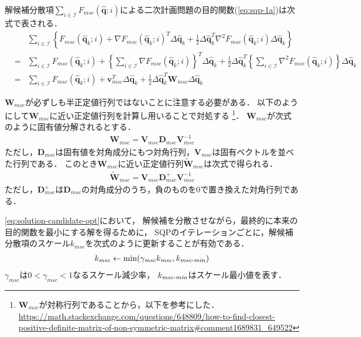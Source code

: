 解候補分散項$\sum_{i \in \mathcal{I}} F_{\mathit{msc}}(\bm{\hat{q}}; i)$による二次計画問題の目的関数(\eqref{eq:sqp-1a})は次式で表される．
\begin{eqnarray}
  &&\sum_{i \in \mathcal{I}} \left\{ F_{\mathit{msc}}(\bm{\hat{q}}_k; i) + \nabla F_{\mathit{msc}}(\bm{\hat{q}}_k; i)^T \Delta \bm{\hat{q}}_k + \frac{1}{2} \Delta \bm{\hat{q}}_k^T \nabla^2 F_{\mathit{msc}}(\bm{\hat{q}}_k; i) \Delta \bm{\hat{q}}_k \right\} \\
  &=&
  \sum_{i \in \mathcal{I}} F_{\mathit{msc}}(\bm{\hat{q}}_k; i)
  + \left\{ \sum_{i \in \mathcal{I}} \nabla F_{\mathit{msc}}(\bm{\hat{q}}_k; i) \right\}^T \Delta \bm{\hat{q}}_k
  + \frac{1}{2} \Delta \bm{\hat{q}}_k^T \left\{ \sum_{i \in \mathcal{I}} \nabla^2 F_{\mathit{msc}}(\bm{\hat{q}}_k; i) \right\} \Delta \bm{\hat{q}}_k \\
  &=&
  \sum_{i \in \mathcal{I}} F_{\mathit{msc}}(\bm{\hat{q}}_k; i) + \bm{v}_{\mathit{msc}}^T \Delta \bm{\hat{q}}_k + \frac{1}{2} \Delta \bm{\hat{q}}_k^T \bm{W}_{\mathit{msc}} \Delta \bm{\hat{q}}_k
\end{eqnarray}

$\bm{W}_{\mathit{msc}}$が必ずしも半正定値行列ではないことに注意する必要がある．
以下のようにして$\bm{W}_{\mathit{msc}}$に近い正定値行列を計算し用いることで対処する
\footnote{$\bm{W}_{\mathit{msc}}$が対称行列であることから，以下を参考にした．\url{https://math.stackexchange.com/questions/648809/how-to-find-closest-positive-definite-matrix-of-non-symmetric-matrix\#comment1689831_649522}}．
$\bm{W}_{\mathit{msc}}$が次式のように固有値分解されるとする．
\begin{eqnarray}
  \bm{W}_{\mathit{msc}} = \bm{V}_{\mathit{msc}} \bm{D}_{\mathit{msc}} \bm{V}_{\mathit{msc}}^{-1}
\end{eqnarray}
ただし，$\bm{D}_{\mathit{msc}}$は固有値を対角成分にもつ対角行列，$\bm{V}_{\mathit{msc}}$は固有ベクトルを並べた行列である．
このとき$\bm{W}_{\mathit{msc}}$に近い正定値行列$\bm{\tilde{W}}_{\mathit{msc}}$は次式で得られる．
\begin{eqnarray}
  \bm{\tilde{W}}_{\mathit{msc}} = \bm{V}_{\mathit{msc}} \bm{D}_{\mathit{msc}}^+ \bm{V}_{\mathit{msc}}^{-1}
\end{eqnarray}
ただし，$\bm{D}_{\mathit{msc}}^+$は$\bm{D}_{\mathit{msc}}$の対角成分のうち，負のものを$0$で置き換えた対角行列である．

\eqref{eq:solution-candidate-opt}において，
解候補を分散させながら，最終的に本来の目的関数を最小にする解を得るために，
SQPのイテレーションごとに，解候補分散項のスケール$k_{\mathit{msc}}$を次式のように更新することが有効である．
\begin{eqnarray}
  k_{\mathit{msc}} \gets \min ( \gamma_{\mathit{msc}} k_{\mathit{msc}}, k_{\mathit{msc\mathchar`-min}})
\end{eqnarray}
$\gamma_{\mathit{msc}}$は$0< \gamma_{\mathit{msc}} < 1$なるスケール減少率，
$k_{\mathit{msc\mathchar`-min}}$はスケール最小値を表す．
